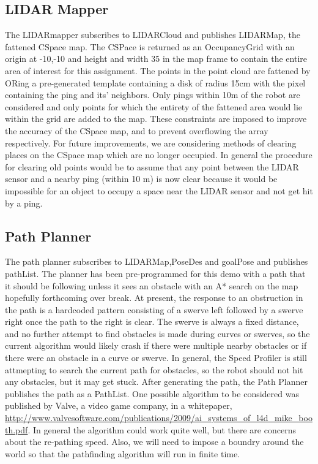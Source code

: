 \documentclass{article}
\begin{document}


\subsection{LIDAR Mapper}

The LIDARmapper subscribes to LIDARCloud and publishes LIDARMap, the fattened CSpace map.
The CSPace is returned as an OccupancyGrid with an origin at -10,-10 and height and width 35 in the map frame to contain the entire area of interest for this assignment.
The points in the point cloud are fattened by ORing a pre-generated template containing a disk of radius 15cm with the pixel containing the ping and its' neighbors.
Only pings within 10m of the robot are considered and only points for which the entirety of the fattened area would lie within the grid are added to the map.
These constraints are imposed to improve the accuracy of the CSpace map, and to prevent overflowing the array respectively.
For future improvements, we are considering methods of clearing places on the CSpace map which are no longer occupied.
In general the procedure for clearing old points would be to assume that any point between the LIDAR sensor and a nearby ping (within 10 m) is now clear because it would be impossible for an object to occupy a space near the LIDAR sensor and not get hit by a ping.



\subsection{Path Planner}

The path planner subscribes to LIDARMap,PoseDes and goalPose and publishes pathList.
The planner has been pre-programmed for this demo with a path that it should be following unless it sees an obstacle with an A* search on the map hopefully forthcoming over break.
At present, the response to an obstruction in the path is a hardcoded pattern consisting of a swerve left followed by a swerve right once the path to the right is clear.
The swerve is always a fixed distance, and no further attempt to find obstacles is made during curves or swerves, so the current algorithm would likely crash if there were multiple nearby obstacles or if there were an obstacle in a curve or swerve.
In general, the Speed Profiler is still attmepting to search the current path for obstacles, so the robot should not hit any obstacles, but it may get stuck.
After generating the path, the Path Planner publishes the path as a PathList.
One possible algorithm to be considered was published by Valve, a video game company, in a whitepaper, \url{http://www.valvesoftware.com/publications/2009/ai_systems_of_l4d_mike_booth.pdf}.
In general the algorithm could work quite well, but there are concerns about the re-pathing speed.
Also, we will need to impose a boundry around the world so that the pathfinding algorithm will run in finite time.
\end{document}

